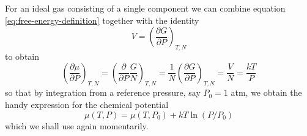 For an ideal gas consisting of a single component we can combine equation \ref{eq:free-energy-definition} together with the identity
\begin{equation}
  V = \left(\frac{\partial G}{\partial P}\right)_{T,N}
\end{equation}
to obtain
\begin{equation}
  \left(\frac{\partial \mu}{\partial P}\right)_{T,N} = \left(\frac{\partial}{\partial P}\frac{G}{N}\right)_{T,N} = \frac{1}{N}\left(\frac{\partial G}{\partial P} \right)_{T,N} = \frac{V}{N} = \frac{kT}{P}
\end{equation}
so that by integration from a reference pressure, say $P_0= 1$ atm, we obtain the handy expression for the chemical potential
\begin{equation}
  \label{eq:mu-ideal}
  \mu(T,P) = \mu(T,P_0) + kT\ln(P/P_0)
\end{equation}
which we shall use again momentarily.



